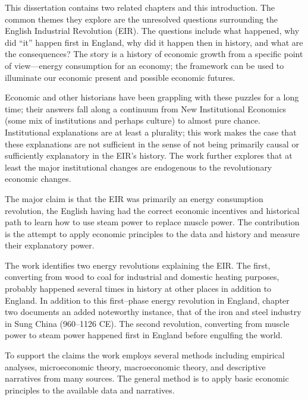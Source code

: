 
\setcounter{page}{4}


	This dissertation contains two related chapters and this introduction. The common themes they explore are the unresolved questions surrounding the English Industrial Revolution (EIR). The questions include what happened, why did ``it'' happen first in England, why did it happen then in history, and what are the consequences? The story is a history of economic growth from a specific point of view---energy consumption for an economy; the framework can be used to illuminate our economic present and possible economic futures.

	Economic and other historians have been grappling with these puzzles for a long time; their answers fall along a continuum from New Institutional Economics (some mix of institutions and perhaps culture) to almost pure chance. Institutional explanations are at least a plurality; this work makes the case that these explanations are not sufficient in the sense of not being primarily causal or sufficiently explanatory in the EIR's history. The work further explores that at least the major institutional changes are endogenous to the revolutionary economic changes.

	The major claim is that the EIR was primarily an energy consumption revolution, the English having had the correct economic incentives and historical path to learn how to use steam power to replace muscle power. The contribution is the attempt to apply economic principles to the data and history and measure their explanatory power.

	The work identifies two energy revolutions explaining the EIR. The first, converting from wood to coal for industrial and domestic heating purposes, probably happened several times in history at other places in addition to England. In addition to this first--phase energy revolution in England, chapter two documents an added noteworthy instance, that of the iron and steel industry in Sung China (960--1126 CE). The second revolution, converting from muscle power to steam power happened first in England before engulfing the world.

	To support the claims the work employs several methods including empirical analyses, microeconomic theory, macroeconomic theory, and descriptive narratives from many sources. The general method is to apply basic economic principles to the available data and narratives.

